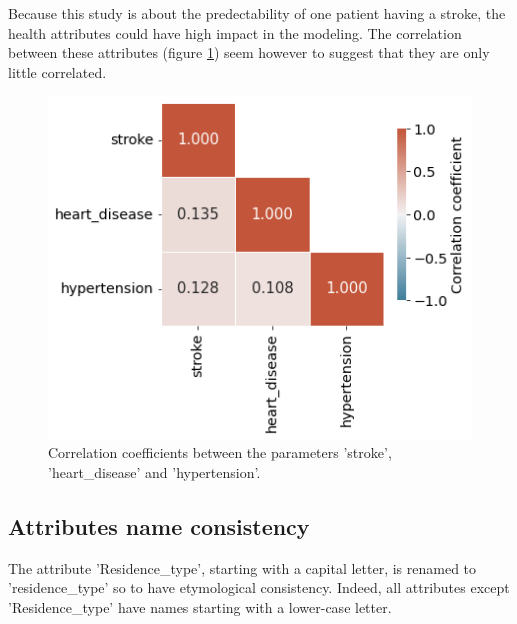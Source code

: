 Because this study is about the predectability of one patient having a stroke, the health attributes 
could have high impact in the modeling. The correlation between these attributes (figure 
\ref{figure_correlation_strokeHeartDiseaseHypertension}) seem however to suggest that they are only 
little correlated.

\begin{figure}[H]
\centering
\includegraphics[scale=0.5]{../figures/correlationMatrix_strokeHeartDiseaseHypertension.png}
\caption{Correlation coefficients between the parameters 'stroke', 'heart\_disease' and 'hypertension'.}
\label{figure_correlation_strokeHeartDiseaseHypertension}
\end{figure}


\subsection{Attributes name consistency}
The attribute 'Residence\_type', starting with a capital letter, is renamed to 'residence\_type' so 
to have etymological consistency. Indeed, all attributes except 'Residence\_type' have names starting 
with a lower-case letter.
